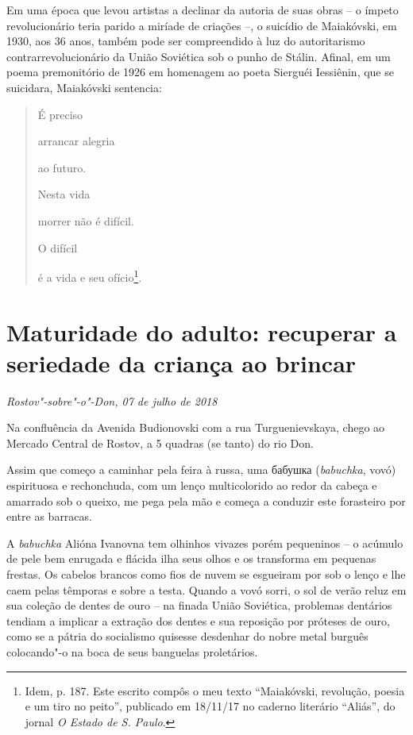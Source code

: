Em uma época que levou artistas a declinar da autoria de suas obras -- o
ímpeto revolucionário teria parido a miríade de criações --, o suicídio
de Maiakóvski, em 1930, aos 36 anos, também pode ser compreendido à luz
do autoritarismo contrarrevolucionário da União Soviética sob o punho de
Stálin. Afinal, em um poema premonitório de 1926 em homenagem ao poeta
Sierguéi Iessiênin, que se suicidara, Maiakóvski sentencia:

\begin{quote}
É preciso

arrancar alegria

ao futuro.

Nesta vida

morrer não é difícil.

O difícil

é a vida e seu ofício\footnote{Idem, p. 187. Este escrito compôs o meu
  texto ``Maiakóvski, revolução, poesia e um tiro no peito'', publicado
  em 18/11/17 no caderno literário ``Aliás'', do jornal \emph{O Estado
  de S. Paulo}.}.
\end{quote}

\chapter*{Maturidade do adulto: recuperar a seriedade da criança ao brincar}

\begin{flushright}
\emph{Rostov"-sobre"-o"-Don, 07 de julho de 2018}
\end{flushright}

Na confluência da Avenida Budionovski com a rua Turguenievskaya, chego
ao Mercado Central de Rostov, a 5 quadras (se tanto) do rio Don.

Assim que começo a caminhar pela feira à russa, uma бабушка
(\emph{babuchka}, vovó) espirituosa e rechonchuda, com um lenço
multicolorido ao redor da cabeça e amarrado sob o queixo, me pega pela
mão e começa a conduzir este forasteiro por entre as barracas.

A \emph{babuchka} Alióna Ivanovna tem olhinhos vivazes porém pequeninos
-- o acúmulo de pele bem enrugada e flácida ilha seus olhos e os
transforma em pequenas frestas. Os cabelos brancos como fios de nuvem se
esgueiram por sob o lenço e lhe caem pelas têmporas e sobre a testa.
Quando a vovó sorri, o sol de verão reluz em sua coleção de dentes de
ouro -- na finada União Soviética, problemas dentários tendiam a
implicar a extração dos dentes e sua reposição por próteses de ouro,
como se a pátria do socialismo quisesse desdenhar do nobre metal burguês
colocando"-o na boca de seus banguelas proletários.

